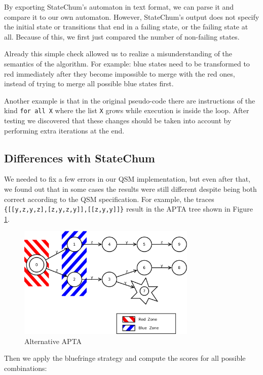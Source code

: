 \documentclass[]{sigplanconf}
\begin{document}
By exporting StateChum's automaton in text format, we can parse it and
compare it to our own automaton. However, StateChum's output does not specify
the initial state or transitions that end in a failing state, or the failing
state at all. Because of this, we first just compared the number of 
non-failing states.

Already this simple check allowed us to realize a misunderstanding
of the semantics of the algorithm. For example: blue states need to
be transformed to red immediately after they become impossible to merge
with the red ones, instead of trying to merge all possible blue states
first.

Another example is that in the original pseudo-code there are
instructions of the kind \texttt{for all X} where the list \texttt{X}
grows while execution is inside the loop. After testing we
discovered that these changes should be taken into account by
performing extra iterations at the end.

\subsection{Differences with StateChum}

We needed to fix a few errors in our QSM implementation, but even after that,
we found out that in some cases the results were still different despite
being both correct according to the QSM specification.
For example, the traces \texttt{\{[[y,z,y,z],[z,y,z,y]],[[z,y,y]]\}} 
result in the APTA tree shown in Figure \ref{fsm5}.

\begin{figure}
\begin{center}
\includegraphics[width=8.5cm]{pictures/fsm5.pdf}
\end{center}
\caption{Alternative APTA}
\label{fsm5}
\end{figure}

Then we apply the bluefringe strategy and compute the scores for all possible
combinations:
\end{document}

